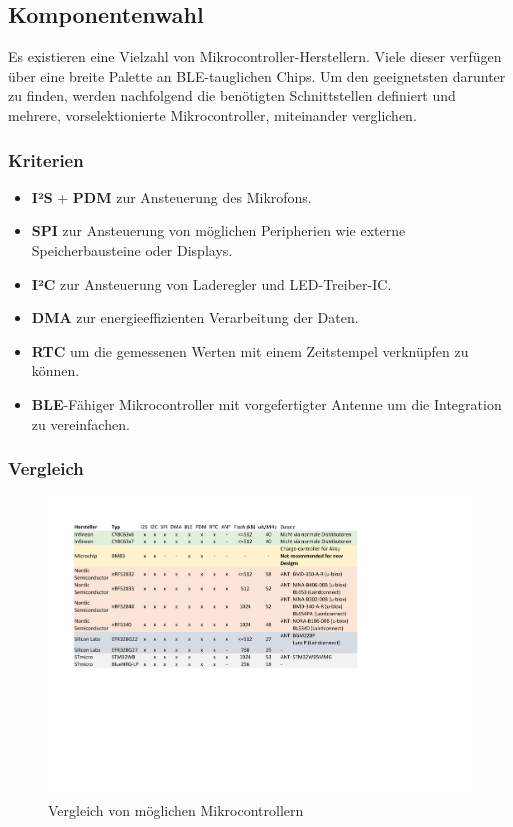 \documentclass[12pt]{article}
\begin{document}
	\subsection{Komponentenwahl}
	Es existieren eine Vielzahl von Mikrocontroller-Herstellern. Viele dieser verfügen über eine breite Palette an BLE-tauglichen Chips. Um den geeignetsten darunter zu finden, werden nachfolgend die benötigten Schnittstellen definiert und mehrere, vorselektionierte Mikrocontroller, miteinander verglichen.
	\subsubsection{Kriterien}
	\begin{itemize}
		\item \textbf{I²S} + \textbf{PDM} zur Ansteuerung des Mikrofons.
		\item \textbf{SPI} zur Ansteuerung von möglichen Peripherien wie externe Speicherbausteine oder Displays.
		\item \textbf{I²C} zur Ansteuerung von Laderegler und LED-Treiber-IC.
		\item \textbf{DMA} zur energieeffizienten Verarbeitung der Daten.
		\item \textbf{RTC} um die gemessenen Werten mit einem Zeitstempel verknüpfen zu können.
		\item \textbf{BLE}-Fähiger Mikrocontroller mit vorgefertigter Antenne um die Integration zu vereinfachen.
	\end{itemize}
	\subsubsection{Vergleich}
	\begin{figure}[H]
		\centering
		\includegraphics[width=1\linewidth]{tables/BAT_Vergleich-Mikrocontroller}
		\caption{Vergleich von möglichen Mikrocontrollern}
		\label{table:batvergleich-mikrocontroller}
	\end{figure}
\end{document}

